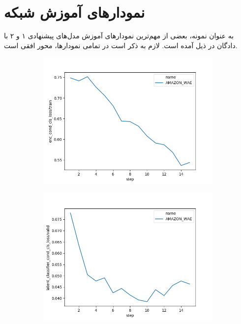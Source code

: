 \chapter{نمودار‌های آموزش شبکه}\label{app:figs}
به عنوان نمونه، بعضی از مهم‌ترین نمودار‌های آموزش مدل‌های پیشنهادی ۱ و ۲ با دادگان \amazon{} در ذیل آمده است. لازم به ذکر است در تمامی نمودار‌ها، محور‌ افقی
است.
\begin{figure}[h]
	\centering
	\begin{subfigure}{0.3\textheight}
		\centering
		\includegraphics[width=1.\textwidth]{images/figs2/2020_01_15__11_37_34__enc_cond_cls_loss.png}
		\caption{}
		\label{fig:chap4:amazon_enc_cls}
	\end{subfigure}
	\begin{subfigure}{0.3\textheight}
		\centering
		\includegraphics[width=1.\textwidth]{images/figs2/2020_01_15__11_37_34__latent_classifier_cond_cls_loss.png}

\end{subfigure}
\end{figure}
